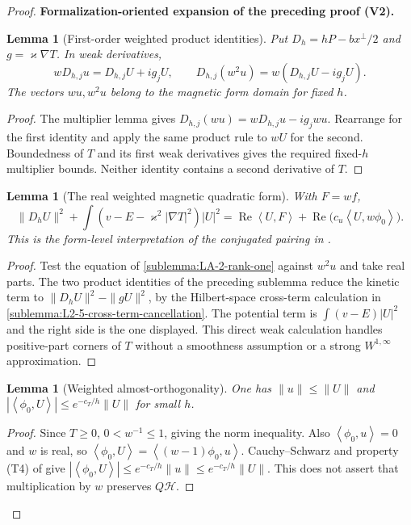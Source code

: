 \documentclass[11pt]{article}
\newtheorem{lemma}[theorem]{Lemma}
\newcommand{\formalisationparentid}{X}
\newenvironment{formalisationaddition}[1]{\par\medskip\begingroup\color{blue}\def\formalisationparentid{#1}\setcounter{formalizationsublemma}{0}\let\lemma\formalizationsublemma\let\endlemma\endformalizationsublemma
  \def\Eo{\mathcal E_h^\circ}\def\EE{\mathcal E_h}\def\phio{\phi_h^\circ}\def\phih{\phi_h}\def\Ho{H_h^{\rm atom}(v^\circ)}\def\Ha{H_h^{\rm atom}}\def\HL{H_h^{L}}\def\Dh{D_h}\def\Log{\operatorname{Log}}\def\ellh{\ell_h}\def\Gp{G_{p,h}}\def\Ast{A_{*,h}}\def\ahat{\widehat{\mathfrak a}_h}\def\ah{\mathfrak a_h}\def\rh{\widehat\rho_h}\def\deltah{\widehat\delta_h}\def\oldref##1{\textup{(##1)}}\def\interface##1{\par\noindent\textit{Analytical interface used here.} ##1\par}\def\finish{\par\noindent\textit{Conclusion of the formalization-oriented expansion.} }\par\noindent\textbf{Formalization-oriented expansion of the preceding proof (V2).}\par\smallskip
}{\par\endgroup\medskip
}
\newcommand{\ip}[2]{\left\langle #1,#2\right\rangle}
\newcommand{\Rea}{\operatorname{Re}}
\begin{document}
\begin{proof}
\begin{formalisationaddition}{LA.2}
\begin{lemma}[First-order weighted product identities]\label{sublemma:LA-2-weighted-products}
Put $D_h=hP-bx^\perp/2$ and $g=\varkappa\nabla T$. In weak derivatives,
\[
 wD_{h,j}u=D_{h,j}U+ig_jU,\qquad
 D_{h,j}(w^2u)=w(D_{h,j}U-ig_jU).
\]
The vectors $wu,w^2u$ belong to the magnetic form domain for fixed $h$.
\end{lemma}
\begin{proof}
The multiplier lemma gives $D_{h,j}(wu)=wD_{h,j}u-ig_jwu$.
Rearrange for the first identity and apply the same product rule to
$wU$ for the second. Boundedness of $T$ and its first weak derivatives
gives the required fixed-$h$ multiplier bounds. Neither identity
contains a second derivative of $T$.
\end{proof}

\begin{lemma}[The real weighted magnetic quadratic form]\label{sublemma:LA-2-conjugation}
With $F=wf$,
\[
 \|D_hU\|^2+\int(v-E-\varkappa^2|\nabla T|^2)|U|^2
       =\Rea\ip U F+\Rea\bigl(c_u\ip U{w\phi_0}\bigr).
\]
This is the form-level interpretation of the conjugated pairing in
.
\end{lemma}
\begin{proof}
Test the equation of \ref{sublemma:LA-2-rank-one} against $w^2u$
and take real parts. The two product identities of the preceding
sublemma reduce the kinetic term to
$\|D_hU\|^2-\|gU\|^2$, by the Hilbert-space cross-term calculation in
\ref{sublemma:L2-5-cross-term-cancellation}. The potential term is
$\int(v-E)|U|^2$ and the right side is the one displayed. This direct
weak calculation handles positive-part corners of $T$ without a
smoothness assumption or a strong $W^{1,\infty}$ approximation.
\end{proof}

\begin{lemma}[Weighted almost-orthogonality]\label{sublemma:LA-2-almost-orthogonality}
One has $\|u\|\le\|U\|$ and
$|\ip{\phi_0}U|\le e^{-c_T/h}\|U\|$ for small $h$.
\end{lemma}
\begin{proof}
Since $T\ge0$, $0<w^{-1}\le1$, giving the norm inequality.
Also $\ip{\phi_0}u=0$ and $w$ is real, so
$\ip{\phi_0}U=\ip{(w-1)\phi_0}u$.
Cauchy--Schwarz and property (T4) of  give
$|\ip{\phi_0}U|\le e^{-c_T/h}\|u\|\le e^{-c_T/h}\|U\|$.
This does not assert that multiplication by $w$ preserves $Q\mathcal H$.
\end{proof}


\end{formalisationaddition}
\end{proof}
\end{document}
